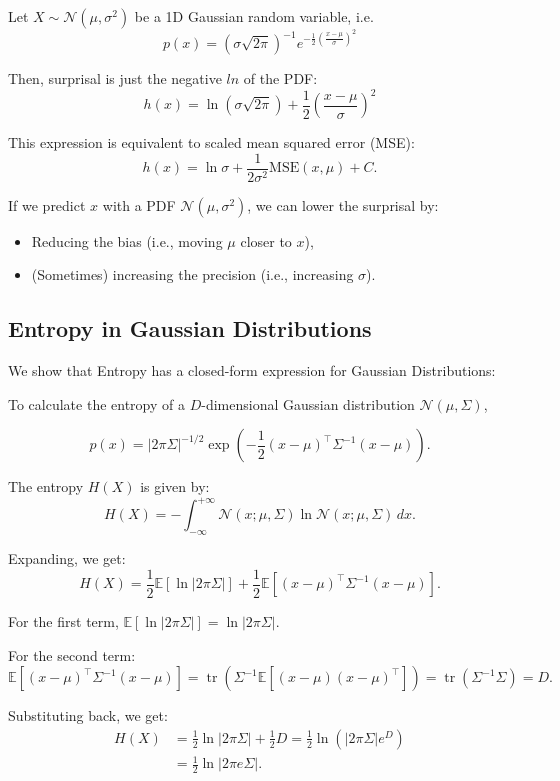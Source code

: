 Let \( X \sim \mathcal{N}(\mu, \sigma^2) \) be a 1D Gaussian random variable, i.e.
\[
    p(x) = \left( \sigma \sqrt{2 \pi} \right)^{-1} e^{-\frac{1}{2} \left( \frac{x - \mu}{\sigma} \right)^2}
\]


Then, surprisal is just the negative $ln$ of the PDF:
\[
    h(x) = \ln \left( \sigma \sqrt{2 \pi} \right) + \frac{1}{2} \left( \frac{x - \mu}{\sigma} \right)^2
\]

This expression is equivalent to scaled mean squared error (MSE):
\[
    h(x) = \ln \sigma + \frac{1}{2 \sigma^2} \text{MSE}(x, \mu) + C.
\]

If we predict \( x \) with a PDF \( \mathcal{N}(\mu, \sigma^2) \), we can lower the surprisal by:

\begin{itemize}
    \item Reducing the bias (i.e., moving \( \mu \) closer to \( x \)),
    \item (Sometimes) increasing the precision (i.e., increasing \( \sigma \)).
\end{itemize}


\subsection{Entropy in Gaussian Distributions}

We show that Entropy has a closed-form expression for Gaussian Distributions:

To calculate the entropy of a \(D\)-dimensional Gaussian distribution \(\mathcal{N}(\mu, \Sigma)\),

\[
    p(x) = |2 \pi \Sigma|^{-1/2} \exp \left( -\frac{1}{2} (x - \mu)^\top \Sigma^{-1} (x - \mu) \right).
\]

The entropy \(H(X)\) is given by:
\[
    H(X) = - \int_{-\infty}^{+\infty} \mathcal{N}(x; \mu, \Sigma) \ln \mathcal{N}(x; \mu, \Sigma) \, dx.
\]

Expanding, we get:
\[
    H(X) = \frac{1}{2} \mathbb{E}[\ln |2 \pi \Sigma|] + \frac{1}{2} \mathbb{E}[(x - \mu)^\top \Sigma^{-1} (x - \mu)].
\]

For the first term, \(\mathbb{E}[\ln |2 \pi \Sigma|] = \ln |2 \pi \Sigma|\).

For the second term:
\[
    \mathbb{E} \left[ (x - \mu)^\top \Sigma^{-1} (x - \mu) \right] = \operatorname{tr} \left( \Sigma^{-1} \mathbb{E} \left[ (x - \mu)(x - \mu)^\top \right] \right) = \operatorname{tr}(\Sigma^{-1} \Sigma) = D.
\]

Substituting back, we get:
\begin{align*}
    H(X) & = \frac{1}{2} \ln |2 \pi \Sigma| + \frac{1}{2} D = \frac{1}{2} \ln \left( |2 \pi \Sigma| e^D \right) \\ &= \frac{1}{2} \ln |2 \pi e \Sigma|.
\end{align*}



